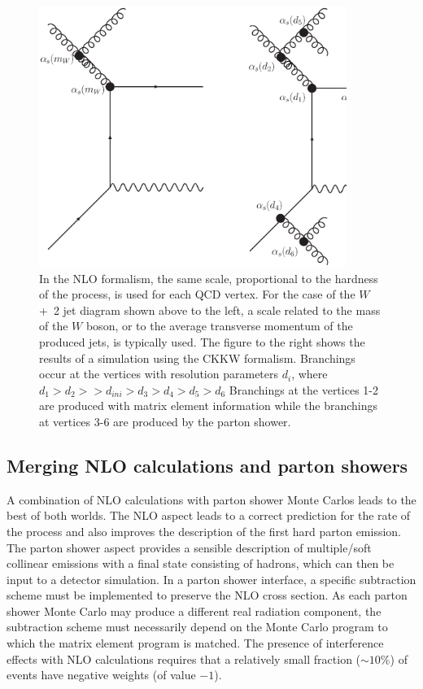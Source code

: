 \documentclass[12pt]{iopart}
\begin{document}
%
\begin{figure}
\begin{center}
\includegraphics[width=10cm]{w2j_ckkw.ps}
\end{center}
\caption{
In the NLO formalism, the same scale, proportional to the hardness of the process,  is used for each QCD vertex. For the case of the
$W$+~2 jet diagram shown above to the left, a scale related to the mass of the $W$ boson, or to the average transverse momentum of the
produced jets, is typically used. The figure to the right shows the results of a simulation using the CKKW formalism. Branchings occur
at the vertices with resolution parameters $d_i$, where $d_1>d_2>>d_{ini}>d_3>d_4>d_5>d_6$ Branchings at the vertices 1-2 are produced
with matrix element information while the branchings at vertices 3-6 are produced by the parton shower. 
} 
\label{fig:w_jets_ckkw}
\end{figure}
%

\subsection{Merging NLO calculations and parton showers}
\label{sec:mergenlo}

A combination of NLO calculations with parton shower Monte Carlos leads to the best of both worlds. The NLO aspect
leads to a correct prediction for the rate of the process and also improves the description of the first hard
parton emission. The parton shower aspect provides a sensible description of multiple/soft collinear emissions with
a final state consisting of hadrons, which can then be input to a detector simulation. In a parton shower
interface, a  specific subtraction  scheme must be implemented to  preserve the NLO cross section. As each parton
shower Monte Carlo may produce a different real radiation component,  the subtraction  scheme must necessarily
depend on the Monte Carlo program to which the matrix element program is matched.  The presence of  interference
effects with NLO calculations requires that a  relatively small fraction ($\sim 10\%$) of events have negative
weights (of value $-1$). 
\end{document}
